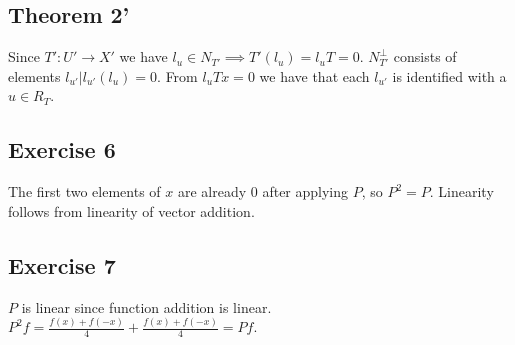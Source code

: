 \subsection*{Theorem 2'}
Since $T': U' \to X'$ we have $l_u \in N_{T'} \implies T'(l_u) = l_u T = 0$.
$N_{T'}^{\perp}$ consists of elements $l_{u'} | l_{u'} (l_u) = 0$.
From $l_u Tx = 0$ we have that each $l_{u'}$ is identified with a $u \in R_T$.

\subsection{Exercise 6}
The first two elements of $x$ are already 0 after applying $P$, so $P^2 = P$.
Linearity follows from linearity of vector addition.

\subsection{Exercise 7}
$P$ is linear since function addition is linear.
$P^2 f = \frac{f(x) + f(-x)}{4} + \frac{f(x) + f(-x)}{4} = P f$.
